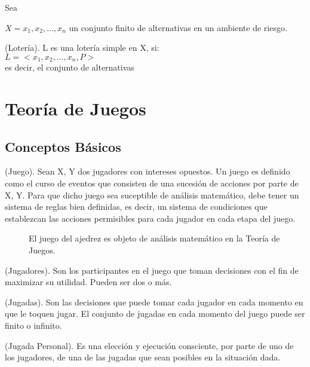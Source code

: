Sea {$X={x_{1}, x_{2}, ..., x_{n}}$ un conjunto finito de alternativas en un ambiente de riesgo.

\begin{defn}(Lotería). L es una lotería simple en X, si:\\
	$L=<{x_{1}, x_{2}, ..., x_{n}}, P>$\\
es decir, el conjunto de alternativas 
\end{defn}





\section{Teoría de Juegos}

\subsection{Conceptos Básicos}

\begin{defn}(Juego). Sean X, Y dos jugadores con intereses opuestos. Un juego es definido como el curso de eventos que consisten de una sucesión de acciones por parte de X, Y. Para que dicho juego sea suceptible de análisis matemático, debe tener un sistema de reglas bien definidas, es decir, un sistema de condiciones que establezcan las acciones permisibles para cada jugador en cada etapa del juego.\\
\end{defn}	

\begin{figure}[h]
	\center
	\label{fig.juegodeajedrez}
		\newgame   %
	\showboard %
	\caption[Juego del Ajedrez]{El juego del ajedrez es objeto de análisis matemático en la Teoría de Juegos.}
\end{figure}


\begin{defn}(Jugadores). Son los participantes en el juego que toman decisiones con el fin de maximizar su utilidad. Pueden ser dos o más.
\end{defn}

\begin{defn}(Jugadas). Son las decisiones que puede tomar cada jugador en cada momento en que le toquen jugar. El conjunto de jugadas en cada momento del juego puede ser finito o infinito.
\end{defn}

\begin{defn}(Jugada Personal). Es una elección y ejecución consciente, por parte de uno de los jugadores, de una de las jugadas que sean posibles en la situación dada.
\end{defn}

}
